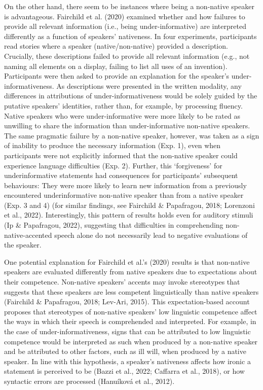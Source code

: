 \documentclass[
  man,floatsintext]{apa7}
\begin{document}
On the other hand, there seem to be instances where being a non-native speaker is advantageous. Fairchild et al. (2020) examined whether and how failures to provide all relevant information (i.e., being under-informative) are interpreted differently as a function of speakers' nativeness. In four experiments, participants read stories where a speaker (native/non-native) provided a description. Crucially, these descriptions failed to provide all relevant information (e.g., not naming all elements on a display, failing to list all uses of an invention). Participants were then asked to provide an explanation for the speaker's under-informativeness. As descriptions were presented in the written modality, any differences in attributions of under-informativeness would be solely guided by the putative speakers' identities, rather than, for example, by processing fluency. Native speakers who were under-informative were more likely to be rated as unwilling to share the information than under-informative non-native speakers. The same pragmatic failure by a non-native speaker, however, was taken as a sign of inability to produce the necessary information (Exp. 1), even when participants were not explicitly informed that the non-native speaker could experience language difficulties (Exp. 2). Further, this `forgiveness' for underinformative statements had consequences for participants' subsequent behaviours: They were more likely to learn new information from a previously encountered underinformative non-native speaker than from a native speaker (Exp. 3 and 4) (for similar findings, see Fairchild \& Papafragou, 2018; Lorenzoni et al., 2022). Interestingly, this pattern of results holds even for auditory stimuli (Ip \& Papafragou, 2022), suggesting that difficulties in comprehending non-native-accented speech alone do not necessarily lead to negative evaluations of the speaker.

One potential explanation for Fairchild et al.'s (2020) results is that non-native speakers are evaluated differently from native speakers due to expectations about their competence. Non-native speakers' accents may invoke stereotypes that suggests that these speakers are less competent linguistically than native speakers (Fairchild \& Papafragou, 2018; Lev-Ari, 2015). This expectation-based account proposes that stereotypes of non-native speakers' low linguistic competence affect the ways in which their speech is comprehended and interpreted. For example, in the case of under-informativeness, signs that can be attributed to low linguistic competence would be interpreted as such when produced by a non-native speaker and be attributed to other factors, such as ill will, when produced by a native speaker. In line with this hypothesis, a speaker's nativeness affects how ironic a statement is perceived to be (Bazzi et al., 2022; Caffarra et al., 2018), or how syntactic errors are processed (Hanuíková et al., 2012).
\end{document}

